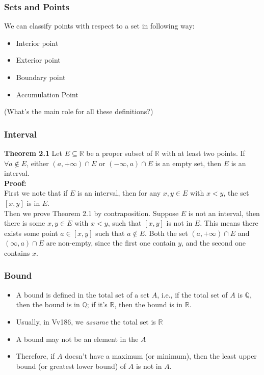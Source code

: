 \documentclass[12pt, t]{beamer}
\renewcommand{\emph}[1]{{\color{Turquoise3}\textsl{#1}}}
\begin{document}
\begin{frame}
    \frametitle{Sets and Points}
We can classify points with respect to a set in following way:
    \begin{itemize}
        \item Interior point
        \item Exterior point
        \item Boundary point
        \item Accumulation Point
    \end{itemize}
(What's the main role for all these definitions?)
\end{frame}

\begin{frame}
    \frametitle{Interval}
    \textbf{Theorem 2.1} Let $E \subseteq \mathbb{R}$ be a proper subset of $\mathbb{R}$ with at least two 
    points. If $\forall a \notin E$, either $(a,+\infty)\cap E$ or $(-\infty, a)\cap E$ is an 
    empty set, then $E$ is an interval.\\
    \textbf{Proof:}\\    
    \hspace{1em} First we note that if $E$ is an interval, then for any $x,y\in E$ with $x<y$, 
    the set $[x,y]$ is in $E$.\\
    \hspace{1em} Then we prove Theorem 2.1 by contraposition. Suppose $E$ is not an interval, 
    then there is some $x,y\in E$ with $x<y$, such that $[x,y]$ is not in $E$. This means there 
    exists some point $a\in [x,y]$ such that $a\notin E$. Both the set $(a,+\infty)\cap E$ and 
    $(\infty,a)\cap E$ are non-empty, since the first one contain $y$, and the second one contains $x$.
\end{frame}

\begin{frame}
    \frametitle{Bound}
    \begin{itemize}
        \item A bound is defined in the total set of a set $A$, i.e., if the total set of $A$ 
            is $\mathbb{Q}$, then the bound is in $\mathbb{Q}$; if it's $\mathbb{R}$, then the 
            bound is in $\mathbb{R}$.
        \item Usually, in Vv186, we \emph{assume} the total set is $\mathbb{R}$
        \item A bound may not be an element in the $A$
        \item Therefore, if $A$ doesn't have a maximum (or minimum), then the least upper bound
            (or greatest lower bound) of $A$ is not in $A$.
    \end{itemize}
\end{frame}
\end{document}
